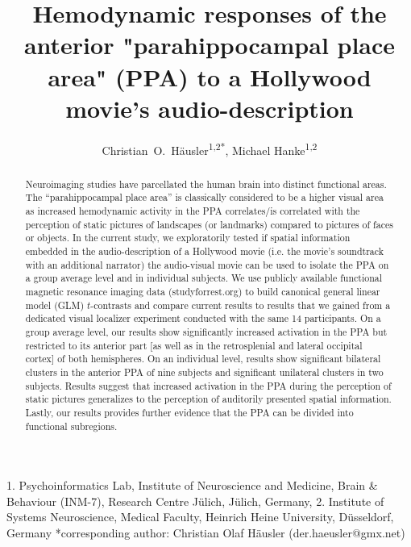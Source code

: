 \documentclass[english]{article}
\begin{document}




\title{Hemodynamic responses of the anterior "parahippocampal place area" (PPA) to a Hollywood movie's audio-description}

\author{Christian~O.~Häusler\textsuperscript{1,2{*}}, Michael
Hanke\textsuperscript{1,2}}

\maketitle
\thispagestyle{fancy}

1. Psychoinformatics Lab, Institute of Neuroscience and Medicine, Brain \&
Behaviour (INM-7), Research Centre Jülich, Jülich, Germany, 2. Institute of
Systems Neuroscience, Medical Faculty, Heinrich Heine University,  Düsseldorf,
Germany {*}corresponding author: Christian Olaf Häusler (der.haeusler@gmx.net)

\begin{abstract}
Neuroimaging studies have parcellated the human brain into distinct functional
areas.
The ``parahippocampal place area'' is classically considered to be a higher
visual area as increased hemodynamic activity in the PPA correlates/is
correlated with the perception of static pictures of landscapes (or landmarks)
compared to pictures of faces or objects.
In the current study, we exploratorily tested if spatial information embedded in
the audio-description of a Hollywood movie (i.e. the movie's soundtrack with an
additional narrator) the audio-visual movie can be used to isolate the PPA on a
group average level and in individual subjects.
%
We use publicly available functional magnetic resonance imaging data
(studyforrest.org) to build canonical general linear model (GLM) $t$-contrasts
and compare current results to results that we gained from a dedicated visual
localizer experiment conducted with the same 14 participants.
On a group average level, our results show significantly increased activation in
the PPA but restricted to its anterior part [as well as in the retrosplenial and
lateral occipital cortex] of both hemispheres.
On an individual level, results show significant bilateral clusters in the
anterior PPA of nine subjects and significant unilateral clusters in two
subjects.
Results suggest that increased activation in the PPA during the perception of
static pictures generalizes to the perception of auditorily presented spatial
information.
Lastly, our results provides further evidence that the PPA can be divided into
functional subregions.\end{abstract}
\end{document}
